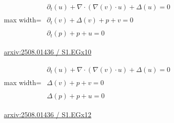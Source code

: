 \documentclass[UTF8,10pt,a4paper,fontset=mac]{ctexart}
\begin{document}
\begin{minipage}{\linewidth}\begin{center}\begin{adjustbox}{max width=\linewidth}$\displaystyle\begin{gathered}\begin{gathered}\partial_{t}(u)+\nabla\cdot(\nabla(v)\cdot u)+\Delta(u)=0\end{gathered}\\[5pt]\begin{gathered}\partial_{t}(v)+\Delta(v)+p+v=0\end{gathered}\\[5pt]\begin{gathered}\partial_{t}(p)+p+u=0\end{gathered}\end{gathered}$\end{adjustbox}\end{center}{\small\href{https://arxiv.org/html/2508.01436#S1.EGx10}{arxiv:2508.01436 / S1.EGx10}}\par\end{minipage}\par\vspace{6mm}

\begin{minipage}{\linewidth}\begin{center}\begin{adjustbox}{max width=\linewidth}$\displaystyle\begin{gathered}\begin{gathered}\partial_{t}(u)+\nabla\cdot(\nabla(v)\cdot u)+\Delta(u)=0\end{gathered}\\[5pt]\begin{gathered}\Delta(v)+p+v=0\end{gathered}\\[5pt]\begin{gathered}\Delta(p)+p+u=0\end{gathered}\end{gathered}$\end{adjustbox}\end{center}{\small\href{https://arxiv.org/html/2508.01436#S1.EGx12}{arxiv:2508.01436 / S1.EGx12}}\par\end{minipage}\par\vspace{6mm}
\end{document}
